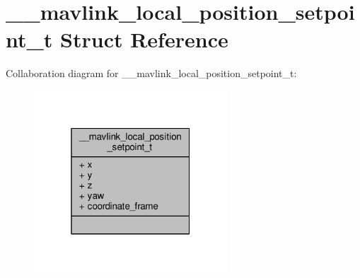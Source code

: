\hypertarget{struct____mavlink__local__position__setpoint__t}{\section{\+\_\+\+\_\+mavlink\+\_\+local\+\_\+position\+\_\+setpoint\+\_\+t Struct Reference}
\label{struct____mavlink__local__position__setpoint__t}
}


Collaboration diagram for \+\_\+\+\_\+mavlink\+\_\+local\+\_\+position\+\_\+setpoint\+\_\+t\+:
\nopagebreak
\begin{figure}[H]
\begin{center}
\leavevmode
\includegraphics[width=205pt]{struct____mavlink__local__position__setpoint__t__coll__graph}
\end{center}
\end{figure}
